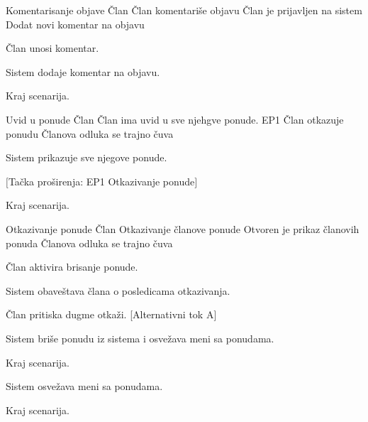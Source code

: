          {Komentarisanje objave}
         {Član}
         {Član komentariše objavu}
         {Član je prijavljen na sistem}
         {Dodat novi komentar na objavu}
         {
            \item Član unosi komentar.
            \item Sistem dodaje komentar na objavu.
            \item Kraj scenarija.
         }
         {}

         {Uvid u ponude}
         {Član}
         {Član ima uvid u sve njehgve ponude. EP1 Član otkazuje ponudu}
         {}
         {Članova odluka se trajno čuva}
         {
            \item Sistem prikazuje sve njegove ponude.
            \item $[$Tačka proširenja: EP1 Otkazivanje ponude$]$
            \item Kraj scenarija.
         }
         {}

        {Otkazivanje ponude}
        {Član}
        {Otkazivanje članove ponude}
        {Otvoren je prikaz članovih ponuda}
        {Članova odluka se trajno čuva}
        {
            \item Član aktivira brisanje ponude.
            \item Sistem obaveštava člana o posledicama otkazivanja.
            \item Član pritiska dugme otkaži. [Alternativni tok A]
            \item Sistem briše ponudu iz sistema i osvežava meni sa ponudama.
            \item Kraj scenarija.
        }
        {
            {
                \item Sistem osvežava meni sa ponudama.
                \item Kraj scenarija.
            }
        }